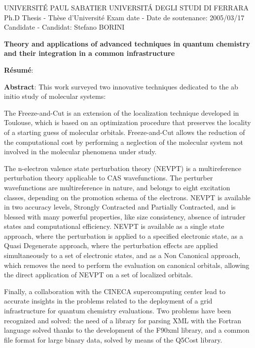 \documentclass[a4paper,11pt,twoside]{book}
\begin{document}
\pagestyle{empty}

UNIVERSIT\'E PAUL SABATIER
UNIVERSIT\'A DEGLI STUDI DI FERRARA
Ph.D Thesis - Th\`ese d'Universit\'e 
Exam date - Date de soutenance: 2005/03/17
Candidate - Candidat: Stefano BORINI

\begin{center}
\textbf{Theory and applications of advanced techniques in quantum chemistry
and their integration in a common infrastructure}
\end{center}

\textbf{R\'esum\'e}:

\textbf{Abstract}:
This work surveyed two innovative techniques dedicated to the ab initio
study of molecular systems:

The Freeze-and-Cut is an extension of the localization technique developed
in Toulouse, which is based on an optimization procedure that preserves the
locality of a starting guess of molecular orbitals. Freeze-and-Cut allows
the reduction of the computational cost by performing a neglection of the
molecular system not involved in the molecular phenomena under study. 

The n-electron valence state perturbation theory (NEVPT) is a
multireference perturbation theory applicable to CAS wavefunctions. 
The perturber wavefunctions are multireference in nature, and belongs to
eight excitation classes, depending on the promotion schema of the
electrons. NEVPT is available in two accuracy levels, Strongly Contracted
and Partially Contracted, and is blessed with many powerful properties, like
size consistency, absence of intruder states and computational efficiency.
NEVPT is available as a single state approach, where the perturbation is
applied to a specified electronic state, as a Quasi Degenerate
approach, where the perturbation effects are applied simultaneously to a set
of electronic states, and as a Non Canonical approach, which removes the
need to perform the evaluation on canonical orbitals, allowing the
direct application of NEVPT on a set of localized orbitals.

Finally, a collaboration with the CINECA supercomputing center lead to
accurate insights in the problems related to the deployment of a grid
infrastructure for quantum chemistry evaluations. Two problems have been
recognized and solved: the need of a library for parsing XML with the
Fortran language solved thanks to the development of the F90xml library, and
a common file format for large binary data, solved by means of the Q5Cost
library.
\end{document}
